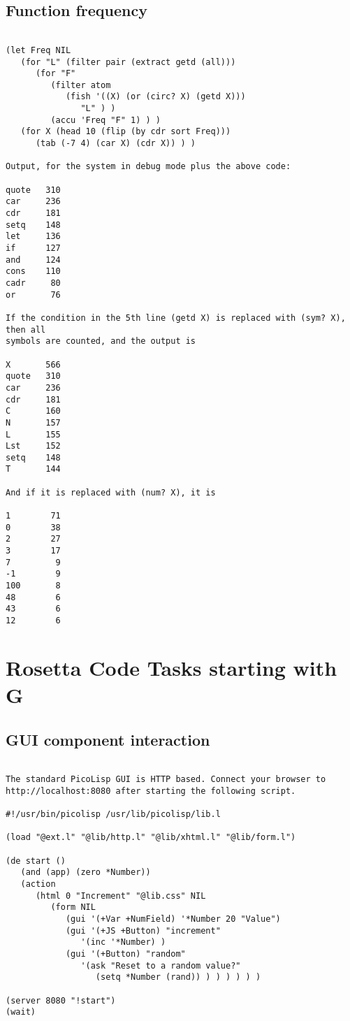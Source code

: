 \section*{Function frequency}

\begin{verbatim}

(let Freq NIL
   (for "L" (filter pair (extract getd (all)))
      (for "F"
         (filter atom
            (fish '((X) (or (circ? X) (getd X)))
               "L" ) )
         (accu 'Freq "F" 1) ) )
   (for X (head 10 (flip (by cdr sort Freq)))
      (tab (-7 4) (car X) (cdr X)) ) )

Output, for the system in debug mode plus the above code:

quote   310
car     236
cdr     181
setq    148
let     136
if      127
and     124
cons    110
cadr     80
or       76

If the condition in the 5th line (getd X) is replaced with (sym? X), then all
symbols are counted, and the output is

X       566
quote   310
car     236
cdr     181
C       160
N       157
L       155
Lst     152
setq    148
T       144

And if it is replaced with (num? X), it is

1        71
0        38
2        27
3        17
7         9
-1        9
100       8
48        6
43        6
12        6

\end{verbatim}

\chapter{Rosetta Code Tasks starting with G}

\section*{GUI component interaction}

\begin{verbatim}

The standard PicoLisp GUI is HTTP based. Connect your browser to
http://localhost:8080 after starting the following script.

#!/usr/bin/picolisp /usr/lib/picolisp/lib.l

(load "@ext.l" "@lib/http.l" "@lib/xhtml.l" "@lib/form.l")

(de start ()
   (and (app) (zero *Number))
   (action
      (html 0 "Increment" "@lib.css" NIL
         (form NIL
            (gui '(+Var +NumField) '*Number 20 "Value")
            (gui '(+JS +Button) "increment"
               '(inc '*Number) )
            (gui '(+Button) "random"
               '(ask "Reset to a random value?"
                  (setq *Number (rand)) ) ) ) ) ) )

(server 8080 "!start")
(wait)

\end{verbatim}

